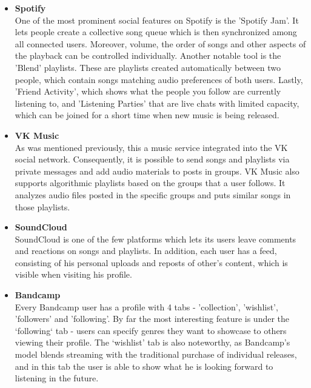 \begin{itemize}
    \item \textbf{Spotify} \\
    One of the most prominent social features on Spotify is the 'Spotify Jam'\cite{spotify_jam}.
    It lets people create a collective song queue which is then synchronized among all connected users.
    Moreover, volume, the order of songs and other aspects of the playback can be controlled individually.
    Another notable tool is the 'Blend' playlists\cite{spotify_recs}. These are playlists created automatically
    between two people, which contain songs matching audio preferences of both users.
    Lastly, 'Friend Activity'\cite{spotify_friend_activ}, which shows what the people you follow are currently listening to,
    and 'Listening Parties' that are live chats with limited capacity,
    which can be joined for a short time when new music is being released\cite{spotify_party_1,spotify_party_2}.

    \item \textbf{VK Music} \\
    As was mentioned previously, this a music service integrated into the VK social network.
    Consequently, it is possible to send songs and playlists via private messages and add audio materials to
    posts in groups. VK Music also supports algorithmic playlists based on the groups that a user follows.
    It analyzes audio files posted in the specific groups and puts similar songs in those playlists.

    \item \textbf{SoundCloud} \\
    SoundCloud is one of the few platforms which lets its users leave comments and reactions on songs and playlists\cite{sc_comments,sc_reactions}.
    In addition, each user has a feed, consisting of his personal uploads and
    reposts of other's content\cite{sc_reposts}, which is visible when visiting his profile.

    \item \textbf{Bandcamp} \\
    Every Bandcamp user has a profile with 4 tabs - 'collection', 'wishlist', 'followers' and 'following'.
    By far the most interesting feature is under the `following` tab - users can specify genres they want to showcase
    to others viewing their profile. The ‘wishlist’ tab is also noteworthy,
    as Bandcamp’s model blends streaming with the traditional purchase of individual releases, and
    in this tab the user is able to show what he is looking forward to listening in the future.
\end{itemize}


